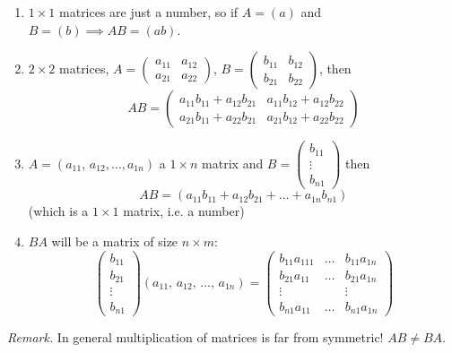 \documentclass[10pt]{scrartcl}
\begin{document}
\begin{examples}
\begin{enumerate}
\item $1 \times 1$ matrices are just a number, so if $A = (a)$ and $B = (b) \implies AB = (ab)$. 
\item $2\times 2$ matrices, $A = \left(\begin{smallmatrix}
a_{11} & a_{12} \\ a_{21} & a_{22}	
\end{smallmatrix}\right)$, $B = \left(\begin{smallmatrix}
b_{11} & b_{12} \\ b_{21} & b_{22}	
\end{smallmatrix}\right)$, then 
\[
  AB = \begin{pmatrix}
  a_{11}b_{11} + a_{12}b_{21} & a_{11}b_{12} + a_{12}b_{22}\\
  a_{21}b_{11} + a_{22}b_{21} & a_{21}b_{12} + a_{22}b_{22}
\end{pmatrix}
\]
\item $A = (a_{11},\,a_{12},\dots,a_{1n})$ a $1\times n$ matrix and $B = \left(\begin{smallmatrix} b_{11}\\\vdots \\ b_{n1}\end{smallmatrix}\right)$ then 
\[
AB = (a_{11}b_{11} + a_{12}b_{21} + \dots + a_{1n}b_{n1})  
\]
(which is a $1\times 1$ matrix, i.e. a number)

\item $BA$ will be a matrix of size $n \times m:$
\[\left(
  \begin{smallmatrix}
  b_{11} \\ b_{21} \\ \vdots \\ b_{n1}	
  \end{smallmatrix}\right)
  (a_{11},\,a_{12},\,\dots ,\,a_{1n}) = 
  \begin{pmatrix}
  	b_{11}a_{111} &  \dots & b_{11}a_{1n}\\
  	b_{21}a_{11} &  \dots & b_{21}a_{1n}\\
  	\vdots &&\vdots\\
  	b_{n1}a_{11} & \dots & b_{n1}a_{1n}
  \end{pmatrix}
\]
\end{enumerate}
\end{examples}\vspace*{5pt}

\emph{Remark.} In general multiplication of matrices is far from symmetric! $AB \neq BA$. 
\end{document}
